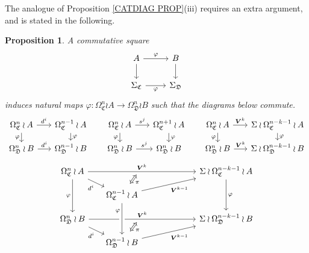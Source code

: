 \documentclass[a4paper,10pt
,draft
]{article}%
\numberwithin{equation}{section}
\numberwithin{figure}{section}
\newtheorem{proposition}[equation]{Proposition}%
\theoremstyle{definition} %
\newcommand{\1}{\ensuremath{\mathbbm 1}}%
\begin{document}
The analogue of Proposition \ref{CATDIAG PROP}(iii) requires an extra argument, and is stated in the following.


\begin{proposition}\label{SPANPIECE PROP}
A commutative square
\begin{equation}\label{SPANPIECE EQ}
\begin{tikzcd}
	A \ar{d} \ar{r}{\varphi} &  \ar{d} B
\\
	\Sigma_{\mathfrak{C}} \ar{r}[swap]{\varphi} & \Sigma_{\mathfrak{D}}
\end{tikzcd}
\end{equation}
induces natural maps 
$\varphi \colon
\Omega_{\mathfrak{C}}^n \wr A \to 
\Omega_{\mathfrak{D}}^n \wr B $
such that the diagrams below commute.
\[
\begin{tikzcd}[column sep = 16pt, row sep = small]
	\Omega^n_{\mathfrak{C}} \wr A \ar{r}{d^i} \ar{d}[swap]{\varphi} &
	\Omega^{n-1}_{\mathfrak{C}} \wr A \ar{d}{\varphi}
&
	\Omega^n_{\mathfrak{C}} \wr A \ar{r}{s^j} \ar{d}[swap]{\varphi} &
	\Omega^{n+1}_{\mathfrak{C}}\wr A \ar{d}{\varphi}
&
	\Omega^n_{\mathfrak{C}} \wr A \ar{r}{\boldsymbol{V}^k} \ar{d}[swap]{\varphi} &
	\Sigma \wr \Omega^{n-k-1}_{\mathfrak{C}} \wr A \ar{d}{\varphi}
\\
	\Omega^n_{\mathfrak{D}} \wr B \ar{r}{d^i} &
	\Omega^{n-1}_{\mathfrak{D}} \wr B
&
	\Omega^n_{\mathfrak{D}} \wr B \ar{r}{s^j} &
	\Omega^n_{\mathfrak{D}} \wr B
&
	\Omega^n_{\mathfrak{D}} \wr B \ar{r}{\boldsymbol{V}^k} &
	\Sigma \wr \Omega^{n-k-1}_{\mathfrak{D}} \wr B
\end{tikzcd}
\]
\[
\begin{tikzcd}[column sep = 16pt, row sep = small]
\Omega^n_{\mathfrak{C}} \wr A
\ar{rrrrr}[name=toE]{\boldsymbol{V}^k} \ar{rd}[swap]{d^i} \ar{dd}[swap]{\varphi}
&&&
&&
\Sigma \wr \Omega^{n-k-1}_{\mathfrak{C}} \wr A  \ar{dd}{\varphi}
\\
&
|[alias=DBE]|
\Omega^{n-1}_{\mathfrak{C}} \wr A \ar{rrrru}[swap]{\boldsymbol{V}^{k-1}}
\\
\Omega^n_{\mathfrak{D}} \wr B \ar{rrrrr}[name=toB]{\boldsymbol{V}^k} \ar{rd}[swap]{d^i}
&&&
&&
\Sigma \wr \Omega^{n-k-1}_{\mathfrak{D}} \wr B
\\
&
|[alias=D]| \Omega^{n-1}_{\mathfrak{D}} \wr B \ar{rrrru}[swap]{\boldsymbol{V}^{k-1}}
\arrow[Leftrightarrow, from=DBE, to=toE, shorten <=0.15cm,shorten >=0.15cm
,swap,"\pi"
]
\arrow[Leftrightarrow, from=D, to=toB, shorten <=0.15cm,shorten >=0.15cm,swap,"\pi"]
\arrow[from=DBE, to=D, crossing over, near start, swap, "\varphi"]
\end{tikzcd}
\]
\end{proposition}
\end{document}
